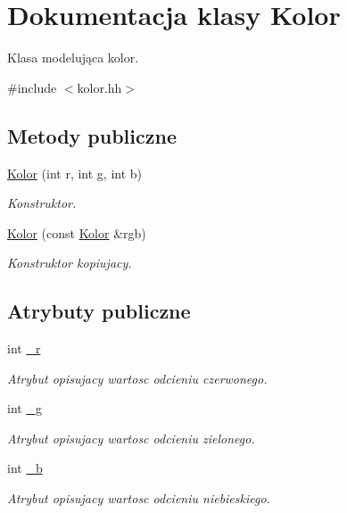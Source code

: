 \hypertarget{class_kolor}{}\section{Dokumentacja klasy Kolor}
\label{class_kolor}


Klasa modelująca kolor.  




{\ttfamily \#include $<$kolor.\+hh$>$}

\subsection*{Metody publiczne}
\begin{DoxyCompactItemize}
\item 
\hyperlink{class_kolor_adde4f304856649a8a148288c271d4775}{Kolor} (int r, int g, int b)
\begin{DoxyCompactList}\small\item\em Konstruktor. \end{DoxyCompactList}\item 
\hyperlink{class_kolor_a79baff3add17cc61abb8bc71f0a426e6}{Kolor} (const \hyperlink{class_kolor}{Kolor} \&rgb)
\begin{DoxyCompactList}\small\item\em Konstruktor kopiujacy. \end{DoxyCompactList}\end{DoxyCompactItemize}
\subsection*{Atrybuty publiczne}
\begin{DoxyCompactItemize}
\item 
int \hyperlink{class_kolor_ad887fb53be523b39fbead6a24671751e}{\+\_\+r}
\begin{DoxyCompactList}\small\item\em Atrybut opisujacy wartosc odcieniu czerwonego. \end{DoxyCompactList}\item 
int \hyperlink{class_kolor_a568f73268d43f0e76c8ae75f0ef20229}{\+\_\+g}
\begin{DoxyCompactList}\small\item\em Atrybut opisujacy wartosc odcieniu zielonego. \end{DoxyCompactList}\item 
int \hyperlink{class_kolor_a543b5984743ac9d471409c697382038b}{\+\_\+b}
\begin{DoxyCompactList}\small\item\em Atrybut opisujacy wartosc odcieniu niebieskiego. \end{DoxyCompactList}\end{DoxyCompactItemize}


